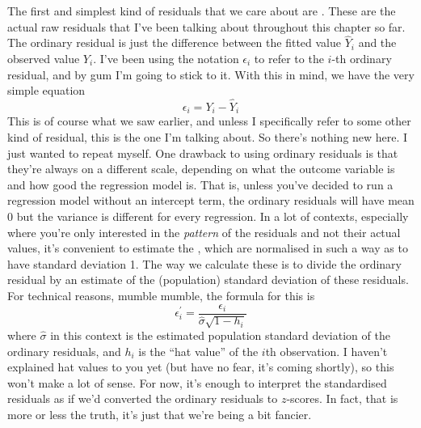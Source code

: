 The first and simplest kind of residuals that we care about are . These are the actual raw residuals that I've been talking about throughout this chapter so far. The ordinary residual is just the difference between the fitted value $\hat{Y}_i$ and the observed value $Y_i$. I've been using the notation $\epsilon_i$ to refer to the $i$-th ordinary residual, and by gum I'm going to stick to it. With this in mind, we have the very simple equation
$$
\epsilon_i = Y_i - \hat{Y}_i
$$
This is of course what we saw earlier, and unless I specifically refer to some other kind of residual, this is the one I'm talking about. So there's nothing new here. I just wanted to repeat myself. One drawback to using ordinary residuals is that they're always on a different scale, depending on what the outcome variable is and how good the regression model is. That is, unless you've decided to run a regression model without an intercept term, the ordinary residuals will have mean 0 but the variance is different for every regression. In a lot of contexts, especially where you're only interested in the {\it pattern} of the residuals and not their actual values, it's convenient to estimate the , which are normalised in such a way as to have standard deviation 1. The way we calculate these is to divide the ordinary residual by an estimate of the (population) standard deviation of these residuals. For technical reasons, mumble mumble, the formula for this is
$$
\epsilon_{i}^\prime = \frac{\epsilon_i}{\hat{\sigma} \sqrt{1-h_i}}
$$
where $\hat\sigma$ in this context is the estimated population standard deviation of the ordinary residuals, and $h_i$ is the ``hat value'' of the $i$th observation. I haven't explained hat values to you yet (but have no fear, it's coming shortly), so this won't make a lot of sense. For now, it's enough to interpret the standardised residuals as if we'd converted the ordinary residuals to $z$-scores. In fact, that is more or less the truth, it's just that we're being a bit fancier. 


